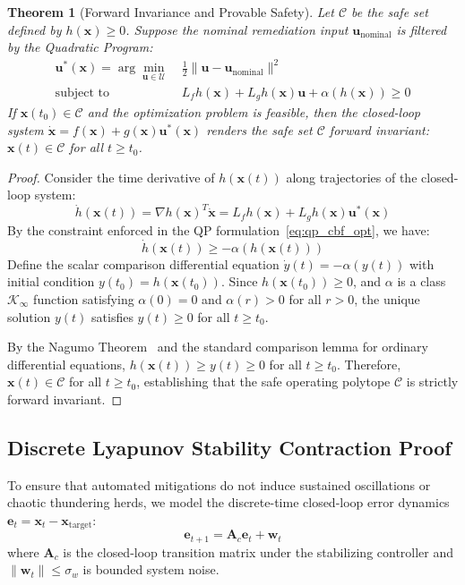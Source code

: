 \documentclass[letterpaper,twocolumn,10pt]{article}
\newtheorem{theorem}{Theorem}
\begin{document}
\begin{theorem}[Forward Invariance and Provable Safety]
\label{thm:cbf_safety}
Let $\mathcal{C}$ be the safe set defined by $h(\mathbf{x}) \ge 0$. Suppose the nominal remediation input $\mathbf{u}_{\text{nominal}}$ is filtered by the Quadratic Program:
\begin{align}
\label{eq:qp_cbf_opt}
\mathbf{u}^*(\mathbf{x}) = \arg\min_{\mathbf{u} \in \mathcal{U}} \ & \frac{1}{2} \|\mathbf{u} - \mathbf{u}_{\text{nominal}}\|^2 \\
\text{subject to } \ & L_f h(\mathbf{x}) + L_g h(\mathbf{x})\mathbf{u} + \alpha(h(\mathbf{x})) \ge 0 \nonumber
\end{align}
If $\mathbf{x}(t_0) \in \mathcal{C}$ and the optimization problem is feasible, then the closed-loop system $\dot{\mathbf{x}} = f(\mathbf{x}) + g(\mathbf{x})\mathbf{u}^*(\mathbf{x})$ renders the safe set $\mathcal{C}$ forward invariant: $\mathbf{x}(t) \in \mathcal{C}$ for all $t \ge t_0$.
\end{theorem}

\begin{proof}
Consider the time derivative of $h(\mathbf{x}(t))$ along trajectories of the closed-loop system:
\begin{equation}
\dot{h}(\mathbf{x}(t)) = \nabla h(\mathbf{x})^T \dot{\mathbf{x}} = L_f h(\mathbf{x}) + L_g h(\mathbf{x})\mathbf{u}^*(\mathbf{x})
\end{equation}
By the constraint enforced in the QP formulation~\eqref{eq:qp_cbf_opt}, we have:
\begin{equation}
\dot{h}(\mathbf{x}(t)) \ge -\alpha(h(\mathbf{x}(t)))
\end{equation}
Define the scalar comparison differential equation $\dot{y}(t) = -\alpha(y(t))$ with initial condition $y(t_0) = h(\mathbf{x}(t_0))$. Since $h(\mathbf{x}(t_0)) \ge 0$, and $\alpha$ is a class $\mathcal{K}_{\infty}$ function satisfying $\alpha(0) = 0$ and $\alpha(r) > 0$ for all $r > 0$, the unique solution $y(t)$ satisfies $y(t) \ge 0$ for all $t \ge t_0$.

By the Nagumo Theorem~\cite{nagumo1942lage} and the standard comparison lemma for ordinary differential equations, $h(\mathbf{x}(t)) \ge y(t) \ge 0$ for all $t \ge t_0$. Therefore, $\mathbf{x}(t) \in \mathcal{C}$ for all $t \ge t_0$, establishing that the safe operating polytope $\mathcal{C}$ is strictly forward invariant.
\end{proof}

\subsection{Discrete Lyapunov Stability Contraction Proof}
To ensure that automated mitigations do not induce sustained oscillations or chaotic thundering herds, we model the discrete-time closed-loop error dynamics $\mathbf{e}_t = \mathbf{x}_t - \mathbf{x}_{\text{target}}$:
\begin{equation}
\label{eq:discrete_dynamics}
\mathbf{e}_{t+1} = \mathbf{A}_c \mathbf{e}_t + \mathbf{w}_t
\end{equation}
where $\mathbf{A}_c$ is the closed-loop transition matrix under the stabilizing controller and $\|\mathbf{w}_t\| \le \sigma_w$ is bounded system noise.
\end{document}
